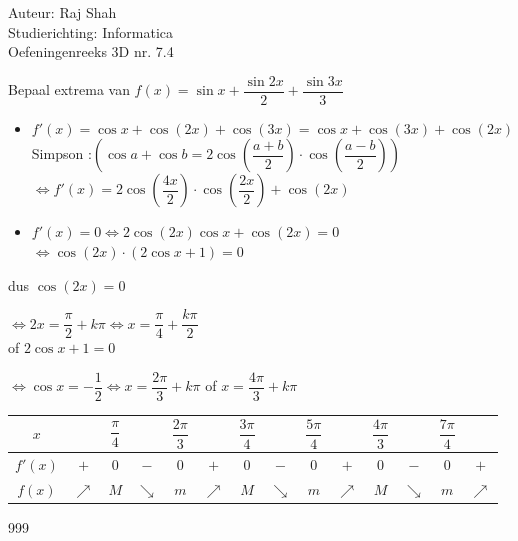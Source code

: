 \documentclass[a4paper]{article}
\begin{document}
  
\noindent \large Auteur: Raj Shah \\
\noindent \large Studierichting: Informatica\\
\noindent \large Oefeningenreeks 3D nr. 7.4 \\

\medskip

\normalsize

Bepaal extrema van $f(x) = \sin x + \dfrac{\sin 2x}{2} + \dfrac{\sin 3x}{3} $ \\

\begin{itemize}
	\item $f'(x) = \cos x +\cos(2x) + \cos(3x) = \cos x + \cos (3x) + \cos (2x)$ \\
	
	Simpson :$ \left(\cos a + \cos b = 2\cos\left(\dfrac{a+b}{2}\right) \cdot \cos\left(\dfrac{a-b}{2}\right)\right)$ \\
	
		$\Leftrightarrow f'(x) = 2 \cos\left(\dfrac{4x}{2}\right) \cdot \cos \left(\dfrac{2x}{2} \right) + \cos (2x) $\\
		
	\item $f'(x) = 0 \Leftrightarrow 2 \cos(2x) \cos x + \cos(2x) = 0 $\\
	
		$\Leftrightarrow \cos(2x) \cdot (2\cos x + 1) = 0 $\\
\end{itemize}

dus $\cos(2x) = 0$
		
	$ \Leftrightarrow 2x = \dfrac{\pi}{2} + k\pi \Leftrightarrow x = \dfrac{\pi}{4} + \dfrac{k\pi}{2} $\\ 
		
of $2\cos x + 1 = 0$
		
	$\Leftrightarrow \cos x = -\dfrac{1}{2} \Leftrightarrow x = \dfrac{2\pi}{3} + k\pi$ of $x = \dfrac{4\pi}{3} + k\pi $\\

\begin{tabular}{c|ccccccccccccc}
$x$	&      $ $	& $\dfrac{\pi}{4}$ & 	$ $	& $\dfrac{2\pi}{3}$ &    $ $     & $ \dfrac{3\pi}{4}$   &   $ $  & $\dfrac{5\pi}{4}$ &    $ $    & $\dfrac{4\pi}{3}$  &    $ $    & $\dfrac{7\pi}{4}$ & $ $ \\ \hline  

$f'(x)$ &    $+$  &           $0$        &    $-$    & 		$0$       &     $+$    &       $0$                 &   $-$  & 	$0$		     &    $+$  &         $0$		&     $-$    & 	$0$		    & $+$ \\   

$f(x)$ &    $\nearrow$  &  $M$      &  $\searrow$    & $m$      &  $\nearrow$ &    $M$            &   $\searrow$  & $m$	&    $\nearrow$  &     $M$      &   $\searrow$   &   $m$	& $\nearrow$ \\ 

\end{tabular}


\begin{thebibliography}{999}
\end{thebibliography}
\end{document}
